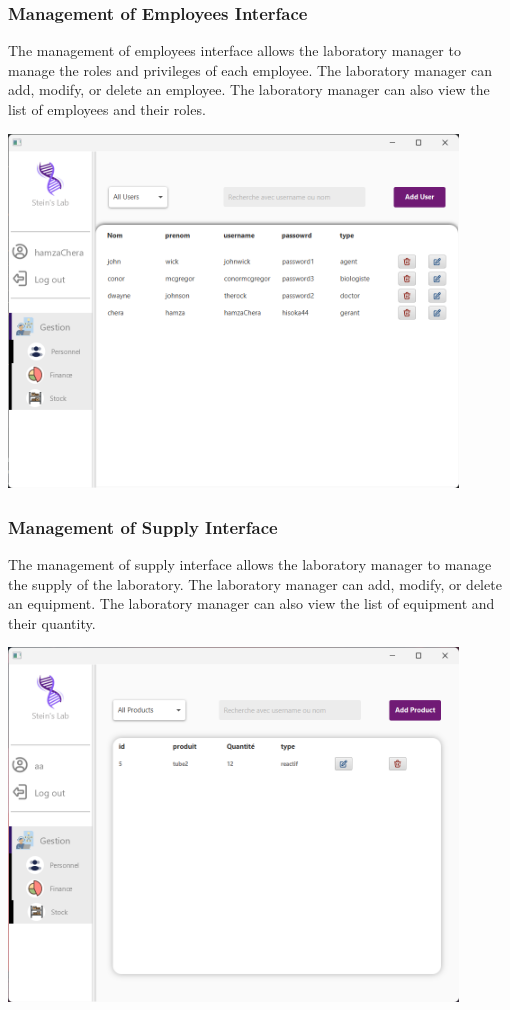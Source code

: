 \documentclass{article}
\begin{document}
\subsubsection*{Management of Employees Interface}
The management of employees interface allows the laboratory manager to manage the roles and privileges of each employee. The laboratory manager can add, modify, or delete an employee. The laboratory manager can also view the list of employees and their roles.
\begin{center}
    \includegraphics[width=451px]{media/interface/gestion personnel.png}
\end{center}

\newpage
\subsubsection*{Management of Supply Interface}
The management of supply interface allows the laboratory manager to manage the supply of the laboratory. The laboratory manager can add, modify, or delete an equipment. The laboratory manager can also view the list of equipment and their quantity.
\begin{center}
    \includegraphics[width=451px]{media/interface/supply management.png}
\end{center}
\end{document}
